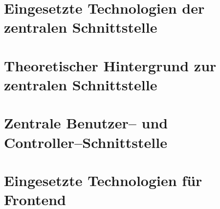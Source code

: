 \documentclass[12pt,a4paper,twoside,openany]{report}
\begin{document}
\pagestyle{footerOnly}

{
\fontsize{5}{6}\selectfont

% 
}

\newpage


\onehalfspacing

{
\renewcommand{\thesection}{\Roman{section}.} 
\renewcommand{\thesubsection}{\thesection.\Roman{subsection}}

}

\newpage
\tableofcontents %
\newpage




\chapter{Eingesetzte Technologien der zentralen Schnittstelle \MjAnnotation{}}
{

}

\chapter{Theoretischer Hintergrund zur zentralen Schnittstelle \MjAnnotation{}}
{

}

\chapter{Zentrale Benutzer-- und Controller--Schnittstelle \MjAnnotation{}}\label{ch-implementation}
{

}

\chapter{Eingesetzte Technologien f\"ur Frontend}
{

}
\end{document}
